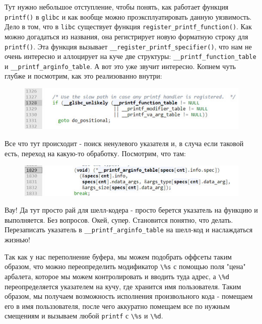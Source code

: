 \documentclass[idxtotoc,hyperref,openany,oneside]{files/pwn} %
\begin{document}
Тут нужно небольшое отступление, чтобы понять, как работает функция \verb|printf()| в \verb|glibc| и как вообще можно проэксплуатировать данную уязвимость. Дело в том, что в \verb|libc| существует функция \verb|register_printf_function()|. Как можно догадаться из названия, она регистрирует новую форматную строку для \verb|printf()|. Эта функция вызывает \verb|__register_printf_specifier()|, что нам не очень интересно и аллоцирует на куче две структуры: \verb|__printf_function_table| и \verb|__printf_arginfo_table|. А вот это уже звучит интересно. Копнем чуть глубже и посмотрим, как это реализованно внутри:
\begin{figure}[H]
\begin{center}
\includegraphics[width=1.0\linewidth]{files/heap-pft}
\end{center}
\label{fig:heap-pft}
\end{figure}

Все что тут происходит - поиск ненулевого указателя и, в случа если таковой есть, переход на какую-то обработку. Посмотрим, что там:
\begin{figure}[H]
\begin{center}
\includegraphics[width=1.0\linewidth]{files/heap-pat}
\end{center}
\label{fig:heap-pat}
\end{figure}
Вау! Да тут просто рай для шелл-кодера - просто берется указатель на функцию и выполняется. Без вопросов. Окей, супер. Становится понятно, что делать. Перезаписать указатель в \verb|__printf_arginfo_table| на шелл-код и наслаждаться жизнью!

Так как у нас переполнение буфера, мы можем подобрать оффсеты таким образом, что можно переопределить модификатор \verb|\%s| с помощью поля "цена" арбалета, которое мы можем контролировать и вводить туда адрес, а \verb|\%d| переопределяется указателем на кучу, где хранится имя пользователя. Таким образом, мы получаем возможность исполнения произвольного кода - помещаем его в имя польззователя, после чего аккуратно помещаем все по нужным смещениям и вызываем любой \verb|printf| с \verb|\%s| и \verb|\%d|.
\end{document}
